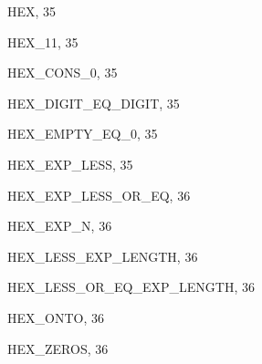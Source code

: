 \begin{theindex}
  \item {\ptt HEX}, 35
  \item {\ptt HEX\_11}, 35
  \item {\ptt HEX\_CONS\_0}, 35
  \item {\ptt HEX\_DIGIT\_EQ\_DIGIT}, 35
  \item {\ptt HEX\_EMPTY\_EQ\_0}, 35
  \item {\ptt HEX\_EXP\_LESS}, 35
  \item {\ptt HEX\_EXP\_LESS\_OR\_EQ}, 36
  \item {\ptt HEX\_EXP\_N}, 36
  \item {\ptt HEX\_LESS\_EXP\_LENGTH}, 36
  \item {\ptt HEX\_LESS\_OR\_EQ\_EXP\_LENGTH}, 36
  \item {\ptt HEX\_ONTO}, 36
  \item {\ptt HEX\_ZEROS}, 36

  \indexspace


\end{theindex}

